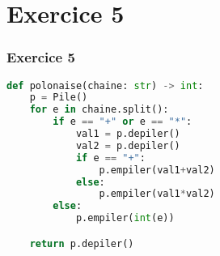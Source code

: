 \documentclass[svgnames,11pt]{beamer}
\begin{document}
\section{Exercice 5}
\begin{frame}[fragile]
    \frametitle{Exercice 5}

\begin{lstlisting}[language=Python , basicstyle=\ttfamily\small, xleftmargin=0em, xrightmargin=0em]
def polonaise(chaine: str) -> int:
    p = Pile()
    for e in chaine.split():
        if e == "+" or e == "*":
            val1 = p.depiler()
            val2 = p.depiler()
            if e == "+":
                p.empiler(val1+val2)
            else:
                p.empiler(val1*val2)
        else:
            p.empiler(int(e))

    return p.depiler()
\end{lstlisting}

\end{frame}
\end{document}
